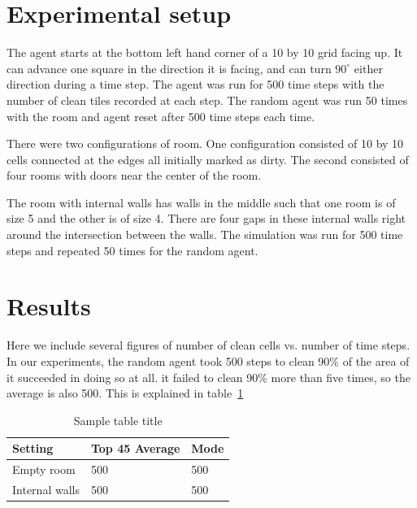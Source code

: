 \documentclass{article}
\begin{document}
\section{Experimental setup}
The agent starts at the bottom left hand corner of a 10 by 10 grid facing up. It can advance one square in the direction it is facing, and can turn $90^\circ$ either direction during a time step. The agent was run for 500 time steps with the number of clean tiles recorded at each step. The random agent was run 50 times with the room and agent reset after 500 time steps each time.

There were two configurations of room. One configuration consisted of 10 by 10 cells connected at the edges  all initially marked as dirty. The second consisted of four rooms with doors near the center of the room. 


The room with internal walls has walls in the middle such that one room is of size 5 and the other is of size 4. There are four gaps in these internal walls right around the intersection between the walls.  The simulation was run for 500 time steps and repeated 50 times for the random agent. 




\section{Results}
Here we include several figures of number of clean cells vs. number of time steps.  In our experiments, the random agent took 500 steps to clean 90\% of the area of it succeeded in doing so at all. it failed to clean 90\% more than five times, so the average is also 500. This is explained in table~\ref{tab:randomPerf}


\begin{table}
  \caption{Sample table title}
  \label{tab:randomPerf}
  \centering
  \begin{tabular}{lll}
    \toprule
    Setting     & Top 45 Average     & Mode \\
    \midrule
    Empty room &  500 & 500    \\
    Internal walls     & 500 & 500     \\
    \bottomrule
  \end{tabular}
\end{table}
\end{document}
